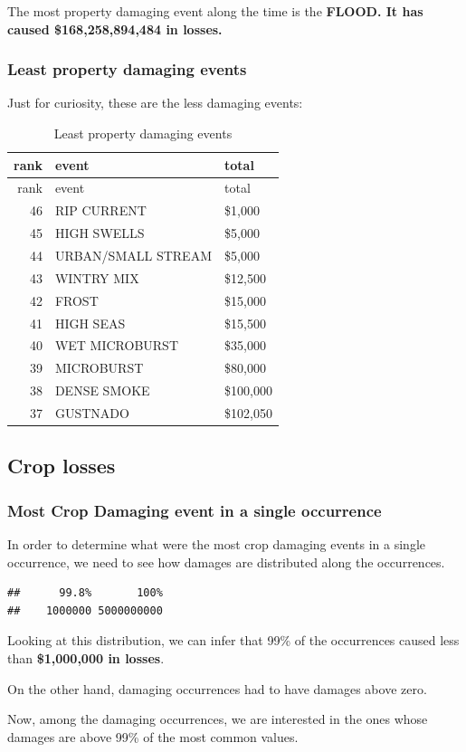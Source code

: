 \documentclass[]{article}
\begin{document}
The most property damaging event along the time is the \textbf{FLOOD. It
has caused \$168,258,894,484 in losses.}

\subsubsection{Least property damaging
events}\label{least-property-damaging-events}

Just for curiosity, these are the less damaging events:

\begin{longtable}[]{@{}rll@{}}
\caption{Least property damaging events}\tabularnewline
\toprule
rank & event & total\tabularnewline
\midrule
\endfirsthead
\toprule
rank & event & total\tabularnewline
\midrule
\endhead
46 & RIP CURRENT & \$1,000\tabularnewline
45 & HIGH SWELLS & \$5,000\tabularnewline
44 & URBAN/SMALL STREAM & \$5,000\tabularnewline
43 & WINTRY MIX & \$12,500\tabularnewline
42 & FROST & \$15,000\tabularnewline
41 & HIGH SEAS & \$15,500\tabularnewline
40 & WET MICROBURST & \$35,000\tabularnewline
39 & MICROBURST & \$80,000\tabularnewline
38 & DENSE SMOKE & \$100,000\tabularnewline
37 & GUSTNADO & \$102,050\tabularnewline
\bottomrule
\end{longtable}

\subsection{Crop losses}\label{crop-losses}

\subsubsection{Most Crop Damaging event in a single
occurrence}\label{most-crop-damaging-event-in-a-single-occurrence}

In order to determine what were the most crop damaging events in a
single occurrence, we need to see how damages are distributed along the
occurrences.

\begin{verbatim}
##      99.8%       100% 
##    1000000 5000000000
\end{verbatim}

Looking at this distribution, we can infer that 99\% of the occurrences
caused less than \textbf{\$1,000,000 in losses}.

On the other hand, damaging occurrences had to have damages above zero.

Now, among the damaging occurrences, we are interested in the ones whose
damages are above 99\% of the most common values.
\end{document}
